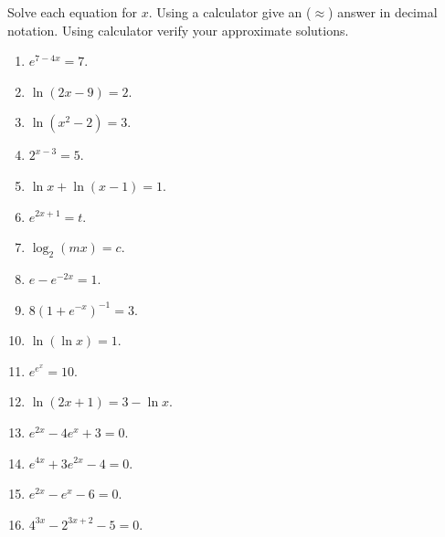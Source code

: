 Solve each equation for $x$. Using a calculator give an ($\approx$) answer in decimal notation. Using calculator verify your approximate solutions.
\begin{multicols}{2}
\begin{enumerate}[ref={\fcProblemRef}]
\item $e^{7-4x}=7$.

\item $\ln (2x-9)=2$.

\item $\ln (x^2-2)=3$.

\item $2^{x-3}=5$.

\item \label{problemlnx+ln(x-1)=1} $\ln x+\ln (x-1)=1$.

\item $e^{2x+1}=t$.

\item $\log_2(m x)=c$.

\item $e- e^{-2x}=1$.

\item $8(1+e^{-x})^{-1}=3$.

\item $\ln (\ln x)=1$.

\item $e^{e^x}=10$.

\item $\ln(2x+1)=3-\ln x$.

\item $e^{2x}-4e^x+3=0$.


\item $e^{4x}+3e^{2x}-4=0$. 

\item $e^{2x}-e^x-6=0$.

\item $4^{3x}-2^{3x+2}-5=0$. 

\end{enumerate}
\end{multicols}


